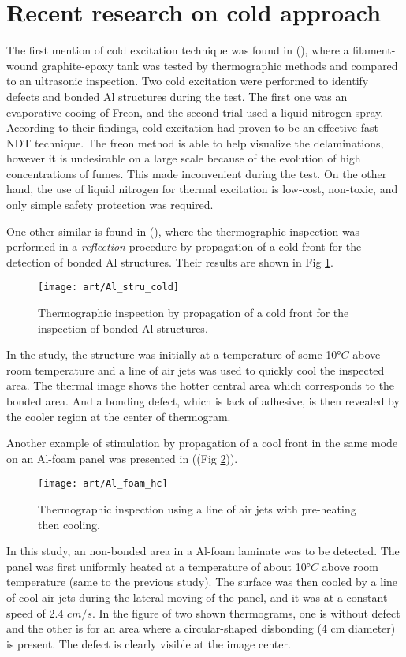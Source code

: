 \section{Recent research on cold approach}
The first mention of cold excitation technique was found in (\citet{Burleigh1989Thermographic}), where a filament-wound graphite-epoxy tank was tested by thermographic methods and compared to an ultrasonic inspection. Two cold excitation were performed to identify defects and bonded Al structures during the test. The first one was an evaporative cooing of Freon, and the second trial used a liquid nitrogen spray. According to their findings, cold excitation had proven to be an effective fast NDT technique. The freon method is able to help visualize the delaminations, however it is undesirable on a large scale because of the evolution of high concentrations of fumes. This made inconvenient during the test. On the other hand, the use of liquid nitrogen for thermal excitation is low-cost, non-toxic, and only simple safety protection was required.


One other similar is found in (\citet{Maldague1994bInfra}), where the thermographic inspection was performed in a \textit{reflection} procedure by propagation of a cold front for the detection of bonded Al structures. Their results are shown in Fig \ref{Al_stru_cold}. 
\begin{figure}[!htbp]
	\centering
	\texttt{[image: art/Al\_stru\_cold]}
	\caption{Thermographic inspection by propagation of a cold front for the inspection of bonded Al structures.}
	\label{Al_stru_cold}
\end{figure}
In the study, the structure was initially at a temperature of some 10$°C$ above room temperature and a line of air jets was used to quickly cool the inspected area. The thermal image shows the hotter central area which corresponds to the bonded area. And a bonding defect, which is lack of adhesive, is then revealed by the cooler region at the center of thermogram.

Another example of stimulation by propagation of a cool front in the same mode on an Al-foam panel was presented in (\citet{Maldague1993Nondestructive}(Fig \ref{Al_foam_hc})).
\begin{figure}[!htbp]
	\centering
	\texttt{[image: art/Al\_foam\_hc]}
	\caption{Thermographic inspection using a line of air jets with pre-heating then cooling.}
	\label{Al_foam_hc}
\end{figure}
In this study, an non-bonded area in a Al-foam laminate was to be detected. The panel was first uniformly heated at a temperature of about 10$°C$ above room temperature (same to the previous study). The surface was then cooled by a line of cool air jets during the lateral moving of the panel, and it was at a constant speed of 2.4 $cm/s$. In the figure of two shown thermograms, one is without defect and the other is for an area where a circular-shaped disbonding (4 cm diameter) is present. The defect is clearly visible at the image center. 

